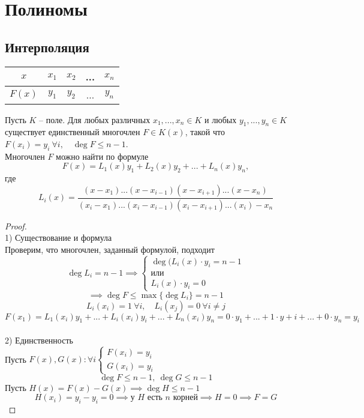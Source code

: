 \chapter{Полиномы}

\section{Интерполяция}

\begin{tabular}{c || c | c | c | c}
	$x$ & $x_1$ & $x_2$ & ... & $x_n$ \\
    \hline
    $F(x)$ & $y_1$ & $y_2$ & ... & $y_n$
\end{tabular}

\begin{theorem}
	Пусть $K$ -- поле. Для любых различных $x_1, ..., x_n \in K$ и любых $y_1, ..., y_n \in K$ существует единственный многочлен $F \in K(x)$, такой что $F(x_i) = y_i ~ \forall i, \quad \deg F \le n - 1 $. \\
    Многочлен $F$ можно найти по формуле
    $$ F(x) = L_1(x)y_1 + L_2(x)y_2 + ... + L_n(x)y_n, $$
    где
    $$ L_i(x) = \frac{(x- x_1)...(x - x_{i-1})(x-x_{i+1})...(x-x_n)}{(x_i-x_1)...(x_i-x_{i-1})(x_i-x_{i+1})...(x_i)-x_n} $$
\end{theorem}

\begin{proof}
	\ \\ 1) Существование и формула \\
    Проверим, что многочлен, заданный формулой, подходит
    $$ \deg L_i = n - 1 \implies \begin{cases} \deg (L_i(x) \cdot y_i = n -1 \\ \text{или} \\ L_i(x) \cdot y_i = 0 \end{cases} $$
    $$ \implies \deg F \le \max \{\deg L_i \} = n - 1 $$
    $$ L_i(x_i) = 1 ~ \forall i, \quad L_i(x_j) = 0 ~ \forall i \ne j$$
    $$ F(x_1) = L_1(x_i)y_1 + ... + L_i(x_i)y_i + ... + L_n(x_i)y_n = 0 \cdot y_1 + ... + 1 \cdot y+i + ... + 0 \cdot y_n = y_i $$
    \ \\
    2) Единственность \ \\
    Пусть $F(x), G(x) : \forall i \begin{cases} F(x_i) = y_i \\ G(x_i) = y_i \end{cases}$
    $$ \deg F \le n - 1, ~ \deg G \le n - 1 $$
    Пусть $ H(x) = F(x) - G(x) \implies \deg H \le n - 1 $
    $$ H(x_i) = y_i - y_i = 0 \implies \text{у } H \text{ есть } n \text{ корней} \implies H = 0 \implies F = G $$
\end{proof}

